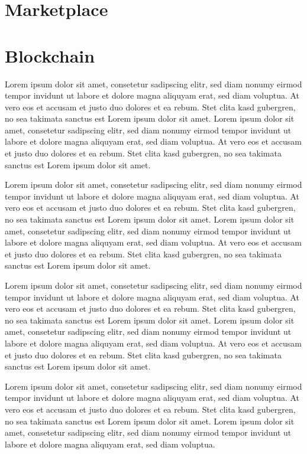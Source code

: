 \section{Marketplace}
\label{sec:marketplace}


\section{Blockchain}
\label{sec:blockchain}

Lorem ipsum dolor sit amet, consetetur sadipscing elitr, sed diam nonumy eirmod tempor invidunt ut labore et dolore magna aliquyam erat, sed diam voluptua. At vero eos et accusam et justo duo dolores et ea rebum. Stet clita kasd gubergren, no sea takimata sanctus est Lorem ipsum dolor sit amet. Lorem ipsum dolor sit amet, consetetur sadipscing elitr, sed diam nonumy eirmod tempor invidunt ut labore et dolore magna aliquyam erat, sed diam voluptua. At vero eos et accusam et justo duo dolores et ea rebum. Stet clita kasd gubergren, no sea takimata sanctus est Lorem ipsum dolor sit amet.

Lorem ipsum dolor sit amet, consetetur sadipscing elitr, sed diam nonumy eirmod tempor invidunt ut labore et dolore magna aliquyam erat, sed diam voluptua. At vero eos et accusam et justo duo dolores et ea rebum. Stet clita kasd gubergren, no sea takimata sanctus est Lorem ipsum dolor sit amet. Lorem ipsum dolor sit amet, consetetur sadipscing elitr, sed diam nonumy eirmod tempor invidunt ut labore et dolore magna aliquyam erat, sed diam voluptua. At vero eos et accusam et justo duo dolores et ea rebum. Stet clita kasd gubergren, no sea takimata sanctus est Lorem ipsum dolor sit amet.

Lorem ipsum dolor sit amet, consetetur sadipscing elitr, sed diam nonumy eirmod tempor invidunt ut labore et dolore magna aliquyam erat, sed diam voluptua. At vero eos et accusam et justo duo dolores et ea rebum. Stet clita kasd gubergren, no sea takimata sanctus est Lorem ipsum dolor sit amet. Lorem ipsum dolor sit amet, consetetur sadipscing elitr, sed diam nonumy eirmod tempor invidunt ut labore et dolore magna aliquyam erat, sed diam voluptua. At vero eos et accusam et justo duo dolores et ea rebum. Stet clita kasd gubergren, no sea takimata sanctus est Lorem ipsum dolor sit amet.

Lorem ipsum dolor sit amet, consetetur sadipscing elitr, sed diam nonumy eirmod tempor invidunt ut labore et dolore magna aliquyam erat, sed diam voluptua. At vero eos et accusam et justo duo dolores et ea rebum. Stet clita kasd gubergren, no sea takimata sanctus est Lorem ipsum dolor sit amet. Lorem ipsum dolor sit amet, consetetur sadipscing elitr, sed diam nonumy eirmod tempor invidunt ut labore et dolore magna aliquyam erat, sed diam voluptua.

